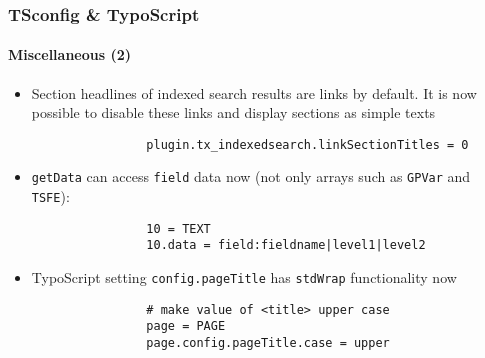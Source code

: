 \begin{frame}[fragile]
	\frametitle{TSconfig \& TypoScript}
	\framesubtitle{Miscellaneous (2)}

	\begin{itemize}

		\item Section headlines of indexed search results are links by default.
			It is now possible to disable these links and display sections as simple texts

			\begin{lstlisting}
				plugin.tx_indexedsearch.linkSectionTitles = 0
			\end{lstlisting}

		\item \texttt{getData} can access \texttt{field} data now (not only arrays
			such as \texttt{GPVar} and \texttt{TSFE}):

			\begin{lstlisting}
				10 = TEXT
				10.data = field:fieldname|level1|level2
			\end{lstlisting}

		\item TypoScript setting \texttt{config.pageTitle} has \texttt{stdWrap} functionality now

			\begin{lstlisting}
				# make value of <title> upper case
				page = PAGE
				page.config.pageTitle.case = upper
			\end{lstlisting}

	\end{itemize}

\end{frame}

